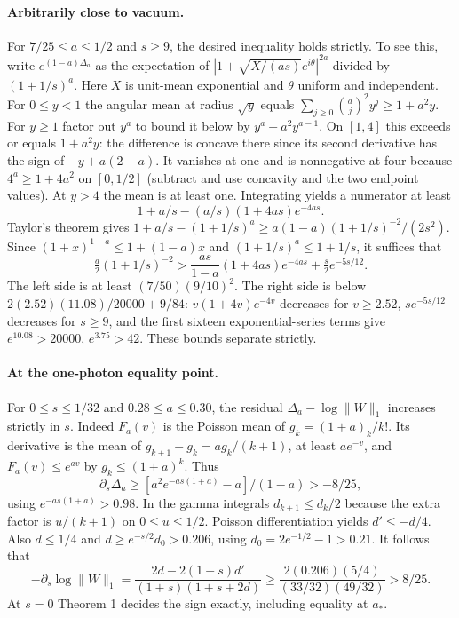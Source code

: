 \documentclass[11pt]{article}
\newcommand{\D}{\Delta}
\begin{document}
\paragraph{Arbitrarily close to vacuum.}
For $7/25\le a\le1/2$ and $s\ge9$, the desired inequality holds strictly. To see this, write $e^{(1-a)\D_a}$ as the expectation of $|1+\sqrt{X/(as)}e^{i\theta}|^{2a}$ divided by $(1+1/s)^a$. Here $X$ is unit-mean exponential and $\theta$ uniform and independent. For $0\le y<1$ the angular mean at radius $\sqrt y$ equals $\sum_{j\ge0}{a\choose j}^2y^j\ge1+a^2y$. For $y\ge1$ factor out $y^a$ to bound it below by $y^a+a^2 y^{a-1}$. On $[1,4]$ this exceeds or equals $1+a^2y$: the difference is concave there since its second derivative has the sign of $-y+a(2-a)$. It vanishes at one and is nonnegative at four because $4^a\ge1+4a^2$ on $[0,1/2]$ (subtract and use concavity and the two endpoint values). At $y>4$ the mean is at least one. Integrating yields a numerator at least
\[
 1+a/s-(a/s)(1+4as)e^{-4as}.
\]
Taylor's theorem gives $1+a/s-(1+1/s)^a\ge a(1-a)(1+1/s)^{-2}/(2s^2)$. Since $(1+x)^{1-a}\le1+(1-a)x$ and $(1+1/s)^a\le1+1/s$, it suffices that
\[
 \tfrac a2(1+1/s)^{-2}>\frac{as}{1-a}(1+4as)e^{-4as}+\tfrac s2 e^{-5s/12}.
\]
The left side is at least $(7/50)(9/10)^2$. The right side is below $2(2.52)(11.08)/20000+9/84$: $v(1+4v)e^{-4v}$ decreases for $v\ge2.52$, $s e^{-5s/12}$ decreases for $s\ge9$, and the first sixteen exponential-series terms give $e^{10.08}>20000$, $e^{3.75}>42$. These bounds separate strictly.

\paragraph{At the one-photon equality point.}
For $0\le s\le1/32$ and $0.28\le a\le0.30$, the residual $\D_a-\log\|W\|_1$ increases strictly in $s$. Indeed $F_a(v)$ is the Poisson mean of $g_k=(1+a)_k/k!$. Its derivative is the mean of $g_{k+1}-g_k=ag_k/(k+1)$, at least $ae^{-v}$, and $F_a(v)\le e^{av}$ by $g_k\le(1+a)^k$. Thus
\[
 \partial_s\D_a\ge [a^2 e^{-as(1+a)}-a]/(1-a)>-8/25 ,
\]
using $e^{-as(1+a)}>0.98$. In the gamma integrals $d_{k+1}\le d_k/2$ because the extra factor is $u/(k+1)$ on $0\le u\le1/2$. Poisson differentiation yields $d'\le-d/4$. Also $d\le1/4$ and $d\ge e^{-s/2}d_0>0.206$, using $d_0=2e^{-1/2}-1>0.21$. It follows that
\[
 -\partial_s\log\|W\|_1
 =\frac{2d-2(1+s)d'}{(1+s)(1+s+2d)}
 \ge\frac{2(0.206)(5/4)}{(33/32)(49/32)}>8/25 .
\]
At $s=0$ Theorem 1 decides the sign exactly, including equality at $a_*$.
\end{document}
